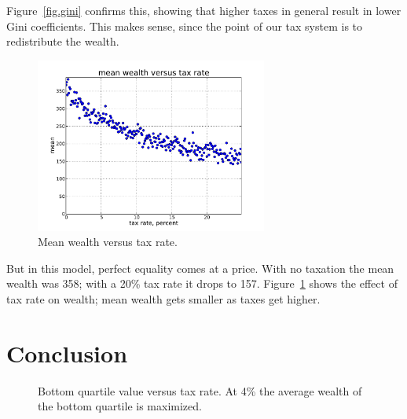 \documentclass[10pt]{book}
\begin{document}
Figure~\ref{fig.gini} confirms this, showing that
higher taxes in general result in lower Gini coefficients. This makes
sense, since the point of our tax system is to redistribute the
wealth.

\begin{figure}[ht]
\centerline{\includegraphics[width=3.0in]{figs/mean_wealth.pdf}}
\caption{Mean wealth versus tax rate.\label{fig.wealth}}
\end{figure}

But in this model, perfect equality comes at a price.  With no taxation
the mean wealth was 358; with a 20\% tax rate it drops to 157.
Figure~\ref{fig.wealth} shows the effect of tax rate on wealth;
mean wealth gets smaller as taxes get higher.



\section{Conclusion}

\begin{figure}[ht]
\caption{Bottom quartile value versus tax rate. At 4\% the average wealth of the bottom quartile is maximized.\label{fig.optimal}}
\end{figure}

\end{document}
